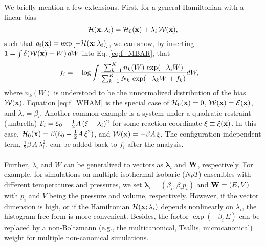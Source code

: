 \documentclass[reprint,aip,jcp,superscriptaddress]{revtex4-1}
\begin{document}
We briefly mention a few extensions.
%
First,
for a general Hamiltonian
with a linear bias
\[
\mathcal{H}(\mathbf{x}; \lambda_i) = \mathcal{H}_0(\mathbf{x}) + \lambda_i \, \mathcal{W}(\mathbf{x}),
\]
such that $q_i(\mathbf{x}) = \exp\left[ -\mathcal{H}(\mathbf{x}; \lambda_i) \right]$,
%
we can show,
by inserting
$1 = \int \delta(\mathcal{W}(\mathbf{x}) - W) \, dW$
into Eq. \eqref{eq:f_MBAR},
that
%
\begin{align}
f_i
&=
-\log
  \int
    \frac{
      \sum_{k = 1}^K n_k(W) \, \exp(-\lambda_i W)
    }
    {
      \sum_{k = 1}^K N_k \, \exp(-\lambda_k W + f_k)
    }
    d W,
\notag
\end{align}
%
where
$n_k(W)$
is understood to be
the unnormalized distribution of
the bias $\mathcal{W}(\mathbf{x})$.
%
Equation \eqref{eq:f_WHAM}
is the special case of
$\mathcal{H}_0(\mathbf{x}) = 0$,
$\mathcal{W}(\mathbf{x}) = \mathcal{E}(\mathbf{x})$,
and $\lambda_i = \beta_i$.
%
Another common example
is a system under a quadratic restraint (umbrella)
$\mathcal{E}_i = \mathcal{E}_0 + \frac 1 2 A \, (\xi - \lambda_i)^2$
for some reaction coordinate $\xi \equiv \xi(\mathbf{x})$.
%
In this case,
$\mathcal{H}_0(\mathbf{x}) = \beta (\mathcal{E}_0 + \frac 1 2 A \, \xi^2)$,
and
$\mathcal{W}(\mathbf{x}) = -\beta A \, \xi$.
%
The configuration independent term,
$\frac 1 2 \beta \, A \, \lambda_i^2$,
can be added back to $f_i$ after the analysis.



\paragraph*{}



Further,
$\lambda_i$ and $W$
can be generalized
to vectors as
$\bm{\lambda}_i$
and
$\mathbf{W}$, respectively.
%
For example,
for simulations
on multiple isothermal-isobaric ($NpT$) ensembles
with different temperatures and pressures,
%
we set
$\bm{\lambda}_i = (\beta_i, \beta_i p_i)$
and
$\mathbf{W} = (E, V)$
with
$p_i$ and $V$
being the pressure and volume,
respectively.
%
However, if the vector dimension is high,
or if the Hamiltonian $\mathcal{H}(\mathbf{x}; \lambda_i)$
depends nonlinearly on $\lambda_i$,
the histogram-free form is more convenient\cite{
shirts2008}.
%
Besides,
the factor $\exp(-\beta_i \, E)$
can be replaced by
a non-Boltzmann
(e.g., the multicanonical\cite{
mezei1987, *berg1992, *lee1993},
Tsallis\cite{tsallis1988},
microcanonical\cite{
yan2003, *martin-mayor2007, *zhang2013})
weight
for multiple non-canonical simulations\cite{
kim2011}.
%
\end{document}
